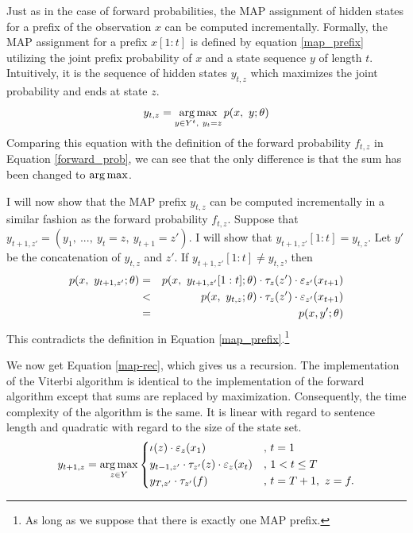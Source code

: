 Just as in the case of forward probabilities, the MAP assignment of
hidden states for a prefix of the observation $x$ can be computed
incrementally. Formally, the MAP assignment for a prefix $x[1:t]$ is
defined by equation \eqref{map_prefix} utilizing the joint prefix
probability of $x$ and a state sequence $y$ of length
$t$. Intuitively, it is the sequence of hidden states $y_{t, z}$ which
maximizes the joint probability and ends at state $z$.
\begin{equation}
y_{t,z} = \operatorname*{arg\,max}_{y\in Y^t,\ y_t = z} p(x,\ y\mbox{$ ; \, $} \theta)\label{map_prefix}
\end{equation}
Comparing this equation with the definition of the forward probability
$f_{t,z}$ in Equation \ref{forward_prob}, we can see that the only
difference is that the sum has been changed to $\operatorname*{arg\,max}$.

I will now show that the MAP prefix $y_{t,z}$ can be computed
incrementally in a similar fashion as the forward probability
$f_{t,z}$. Suppose that $y_{t+1, z'} = (y_1,\ ...,\ y_t = z,\ y_{t+1}
= z')$. I will show that $y_{t+1, z'}[1:t] = y_{t,z}$. Let $y'$ be the concatenation of $y_{t,z}$ and $z'$. If $y_{t+1,z'}[1:t] \ne y_{t,z}$, then
\begin{eqnarray*}
p(x,\ y_{t+1,z'}\parcond \theta) & = & p(x,\ y_{t+1,z'}[1:t]\parcond \theta) \cdot \tau_z(z')\cdot\varepsilon_{z'}(x_{t+1})\\ 
                                 & < & p(x,\ y_{t,z}\parcond \theta) \cdot \tau_z(z')\cdot\varepsilon_{z'}(x_{t+1})\\
                                 & = & p(x, y'\parcond\theta)
\end{eqnarray*}
This contradicts the definition in Equation \eqref{map_prefix}.\footnote{As long as we suppose that there is exactly one MAP prefix.}

We now get Equation \eqref{map-rec}, which gives us a recursion. The
implementation of the Viterbi algorithm is identical to the
implementation of the forward algorithm except that sums are replaced
by maximization. Consequently, the time complexity of the algorithm is the
same. It is linear with regard to sentence length and quadratic with
regard to the size of the state set.
\begin{equation}
y_{t+1, z} = \operatorname*{arg\,max}_{z \in Y}\left\{
\begin{aligned}
&\iota(z) \cdot \varepsilon_{z}(x_1)  & , &\  t = 1\\
&y_{t - 1, z'}\cdot \tau_{z'}(z) \cdot \varepsilon_{z}(x_{t}) & ,&\ 1 < t \le T\\
&y_{T, z'}\cdot \tau_{z'}(f) & ,&\  t = T + 1,\ z = f.
\end{aligned}
\right.
\label{map-rec}
\end{equation}

